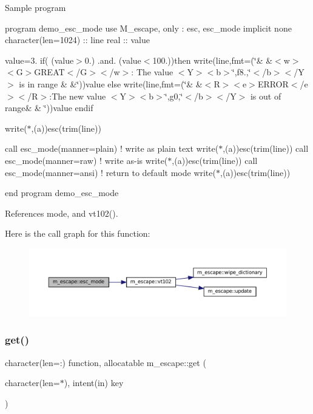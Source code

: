 Sample program

program demo\+\_\+esc\+\_\+mode use M\+\_\+escape, only \+: esc, esc\+\_\+mode implicit none character(len=1024) \+:\+: line real \+:\+: value

value=3. if( (value$>$0.) .and. (value$<$100.))then write(line,fmt=\textquotesingle{}(\char`\"{}\&
       \&$<$w$>$$<$\+G$>$\+G\+R\+E\+A\+T$<$/\+G$>$$<$/w$>$\+: The value $<$\+Y$>$$<$b$>$\char`\"{},f8.,\char`\"{}$<$/b$>$$<$/\+Y$>$ is in range \&
       \&\char`\"{})\textquotesingle{})value else write(line,fmt=\textquotesingle{}(\char`\"{}\&
       \&$<$\+R$>$$<$e$>$\+E\+R\+R\+O\+R$<$/e$>$$<$/\+R$>$\+:\+The new value $<$\+Y$>$$<$b$>$\char`\"{},g0,\char`\"{}$<$/b$>$$<$/\+Y$>$ is out of range\&
       \& \char`\"{})\textquotesingle{})value endif

write($\ast$,\textquotesingle{}(a)\textquotesingle{})esc(trim(line))

call esc\+\_\+mode(manner=\textquotesingle{}plain\textquotesingle{}) ! write as plain text write($\ast$,\textquotesingle{}(a)\textquotesingle{})esc(trim(line)) call esc\+\_\+mode(manner=\textquotesingle{}raw\textquotesingle{}) ! write as-\/is write($\ast$,\textquotesingle{}(a)\textquotesingle{})esc(trim(line)) call esc\+\_\+mode(manner=\textquotesingle{}ansi\textquotesingle{}) ! return to default mode write($\ast$,\textquotesingle{}(a)\textquotesingle{})esc(trim(line))

end program demo\+\_\+esc\+\_\+mode 

References mode, and vt102().

Here is the call graph for this function\+:\nopagebreak
\begin{figure}[H]
\begin{center}
\leavevmode
\includegraphics[width=350pt]{namespacem__escape_a4210456d81d9a1bf328093a9635e640b_cgraph}
\end{center}
\end{figure}
\mbox{\label{namespacem__escape_af555c90c278ff964d8bce93ee0368a42}} 
\subsubsection{\texorpdfstring{get()}{get()}}
{\footnotesize\ttfamily character(len=\+:) function, allocatable m\+\_\+escape\+::get (\begin{DoxyParamCaption}\item[{character(len=$\ast$), intent(in)}]{key }\end{DoxyParamCaption})\hspace{0.3cm}{\ttfamily [private]}}



